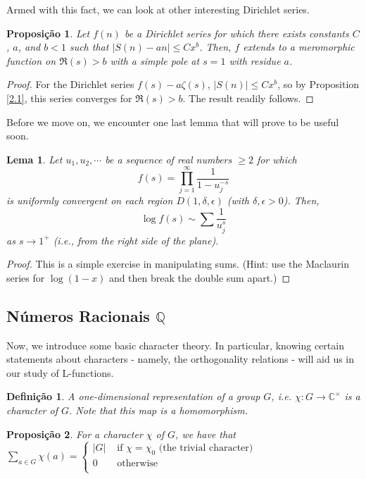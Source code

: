 \documentclass{article}
\newcommand{\CC}{\mathbb{C}}
\newcommand{\QQ}{\mathbb{Q}}
\theoremstyle{plain}
\newtheorem{prop}{Proposição}
\newtheorem{lemma}{Lema}
\newtheorem{defn}{Definição}
\theoremstyle{remark}
\numberwithin{equation}{section}
\numberwithin{thm}{section}
\numberwithin{defn}{section}
\numberwithin{lemma}{section}
\numberwithin{axm}{section}
\begin{document}
Armed with this fact, we can look at other interesting Dirichlet series. 

\begin{prop}
Let $f(n)$ be a Dirichlet series for which there exists constants $C$, $a$, and $b < 1$ such that $|S(n) - an| \le Cx^b$. Then, $f$ extends to a meromorphic function on $\Re(s) > b$ with a simple pole at $s = 1$ with residue $a$. 
\end{prop}

\begin{proof}
For the Dirichlet series $f(s) - a\zeta(s)$, $|S(n)| \le Cx^b$, so by Proposition \ref{2.1}, this series converges for $\Re(s) > b$. The result readily follows.  
\end{proof}

Before we move on, we encounter one last lemma that will prove to be useful soon.

\begin{lemma} \label{2.5}
Let $u_1, u_2, \cdots$ be a sequence of real numbers $\ge 2$ for which $$f(s) = \prod_{j = 1}^{\infty} \frac{1}{1 - u_{j}^{-s}}$$ is uniformly convergent on each region $D(1, \delta, \epsilon)$ (with $\delta, \epsilon > 0$). Then, $$\log f(s) \sim \sum \frac{1}{u_{j}^{s}}$$ as $s \to 1^{+}$ (i.e., from the right side of the plane). 
\end{lemma}

\begin{proof}
This is a simple exercise in manipulating sums. (Hint: use the Maclaurin series for $\log(1-x)$ and then break the double sum apart.)
\end{proof}


\subsection{Números Racionais \(\QQ\) }

Now, we introduce some basic character theory. In particular, knowing certain statements about characters - namely, the orthogonality relations - will aid us in our study of L-functions.

\begin{defn}
A one-dimensional representation of a group $G$, i.e. $\chi: G \longrightarrow \CC^{\times}$ is a character of $G$. Note that this map is a homomorphism.
\end{defn}

\begin{prop} \label{3.2}
For a character $\chi$ of $G$, we have that $\sum_{a \in G} \chi(a) = \begin{cases}
|G| & \text{ if } \chi = \chi_{0} \text{ (the trivial character)} \\
0 &  \text { otherwise } \\
\end{cases}$  

\end{prop}
\end{document}
